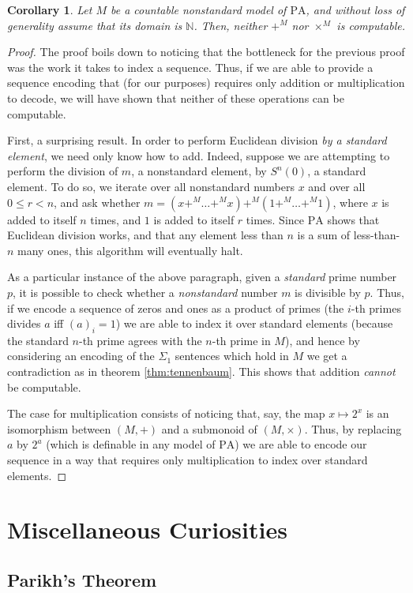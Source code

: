 \documentclass{article}
\newtheorem{corollary}[theorem]{Corollary}
\theoremstyle{nonumberplain}
\newtheorem{proof}{Proof}
\newcommand{\N}{\mathbb{N}}
\newcommand{\PA}{\mathrm{PA}}
\begin{document}
\begin{corollary}\label{cor:tennenbaum}
Let $M$ be a countable nonstandard model of $\PA$, and without loss of generality assume that its domain is $\N$. Then, neither $+^M$ nor $\times^M$ is computable.
\end{corollary}

\begin{proof}
The proof boils down to noticing that the bottleneck for the previous proof was the work it takes to index a sequence. Thus, if we are able to provide a sequence encoding that (for our purposes) requires only addition or multiplication to decode, we will have shown that neither of these operations can be computable.

First, a surprising result. In order to perform Euclidean division \emph{by a standard element}, we need only know how to add. Indeed, suppose we are attempting to perform the division of $m$, a nonstandard element, by $S^n(0)$, a standard element. To do so, we iterate over all nonstandard numbers $x$ and over all $0 \leq r < n$, and ask whether $m = (x +^M \dots +^M x) +^M (1 +^M \dots +^M 1)$, where $x$ is added to itself $n$ times, and $1$ is added to itself $r$ times. Since $\PA$ shows that Euclidean division works, and that any element less than $n$ is a sum of less-than-$n$ many ones, this algorithm will eventually halt.

As a particular instance of the above paragraph, given a \emph{standard} prime number $p$, it is possible to check whether a \emph{nonstandard} number $m$ is divisible by $p$. Thus, if we encode a sequence of zeros and ones as a product of primes (the $i$-th primes divides $a$ iff $(a)_i = 1$) we are able to index it over standard elements (because the standard $n$-th prime agrees with the $n$-th prime in $M$), and hence by considering an encoding of the $\Sigma_1$ sentences which hold in $M$ we get a contradiction as in theorem \ref{thm:tennenbaum}. This shows that addition \emph{cannot} be computable.

The case for multiplication consists of noticing that, say, the map $x \mapsto 2^x$ is an isomorphism between $(M,+)$ and a submonoid of $(M,\times)$. Thus, by replacing $a$ by $2^a$ (which is definable in any model of $\PA$) we are able to encode our sequence in a way that requires only multiplication to index over standard elements.
\end{proof}


\section{Miscellaneous Curiosities}

\subsection{Parikh's Theorem}



\end{document}
